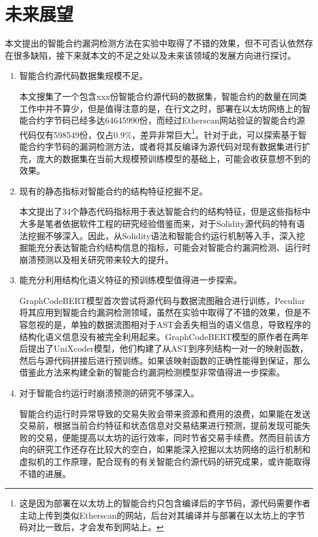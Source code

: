 \section{未来展望}

本文提出的智能合约漏洞检测方法在实验中取得了不错的效果，但不可否认依然存在很多缺陷，接下来就本文的不足之处以及未来该领域的发展方向进行探讨。

\begin{enumerate}[label=(\arabic*)]
    \item 智能合约源代码数据集规模不足。
    
    本文搜集了一个包含xxx份智能合约源代码的数据集，智能合约的数量在同类工作中并不算少，但是值得注意的是，在行文之时，部署在以太坊网络上的智能合约字节码已经多达\num{64645990}份，而经过Etherscan网站验证的智能合约源代码仅有\num{598549}份，仅占0.9\%，差异非常巨大\footnote{这是因为部署在以太坊上的智能合约只包含编译后的字节码，源代码需要作者主动上传到类似Etherscan的网站，后台对其编译并与部署在以太坊上的字节码对比一致后，才会发布到网站上。}。针对于此，可以探索基于智能合约字节码的漏洞检测方法，或者将其反编译为源代码对现有数据集进行扩充，庞大的数据集在当前大规模预训练模型的基础上，可能会收获意想不到的效果。

    \item 现有的静态指标对智能合约的结构特征挖掘不足。
    
    本文提出了34个静态代码指标用于表达智能合约的结构特征，但是这些指标中大多是笔者依据软件工程的研究经验借鉴而来，对于Solidity源代码的特有语法挖掘不够深入。因此，从Solidity语法和智能合约运行机制等入手，深入挖掘能充分表达智能合约结构信息的指标，可能会对智能合约漏洞检测、运行时崩溃预测以及相关研究带来较大的提升。
    
    \item 能充分利用结构化语义特征的预训练模型值得进一步探索。
    
    GraphCodeBERT\cite{guo2020graphcodebert}模型首次尝试将源代码与数据流图融合进行训练，Peculiar\cite{wu2021peculiar}将其应用到智能合约漏洞检测领域，虽然在实验中取得了不错的效果，但是不容忽视的是，单独的数据流图相对于AST会丢失相当的语义信息，导致程序的结构化语义信息没有被完全利用起来。GraphCodeBERT模型的原作者在两年后提出了UniXcoder模型，他们构建了从AST到序列结构一对一的映射函数，然后与源代码拼接后进行预训练。如果该映射函数的正确性能得到保证，那么借鉴此方法来构建全新的智能合约漏洞检测模型非常值得进一步探索。

    \item 对于智能合约运行时崩溃预测的研究不够深入。
    
    智能合约运行时异常导致的交易失败会带来资源和费用的浪费，如果能在发送交易前，根据当前合约特征和状态信息对交易结果进行预测，提前发现可能失败的交易，便能提高以太坊的运行效率，同时节省交易手续费。然而目前该方向的研究工作还存在比较大的空白，如果能深入挖掘以太坊网络的运行机制和虚拟机的工作原理，配合现有的有关智能合约源代码的研究成果，或许能取得不错的进展。
\end{enumerate}


